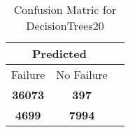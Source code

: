 \begin{table}[] 
\caption{Confusion Matric for DecisionTrees20} 
\label{Table: Prediction Accuracy-DMDDecisionTrees20OnlySunEKF-resetReflectionEKF-top2perfectNoFailurePrediction-Reflection} 
\centering 
\begin{tabular} 
 {@{}ccc@{}} 
\toprule 
\multicolumn{2}{c}{\textbf{Predicted}}
 \\ \midrule 
\multicolumn{1}{|c|}{Failure} & 
\multicolumn{1}{c|}{No Failure}
 \\ \midrule 
\multicolumn{1}{|c|}{\color{green}\textbf{36073}} & 
\multicolumn{1}{c|}{\color{red}\textbf{397}}
 \\ \midrule 
\multicolumn{1}{|c|}{\color{red}\textbf{4699}} & 
\multicolumn{1}{c|}{\color{green}\textbf{7994}}
 \\ \bottomrule 
\end{tabular} 
\end{table} 
